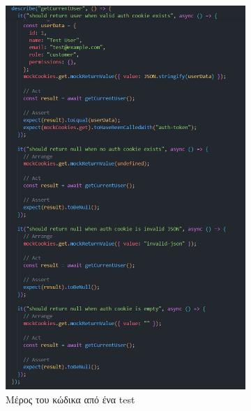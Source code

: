 \documentclass[12pt,a4paper,twoside]{book}
\begin{document}
\begin{figure}[H]
    \centering
    \begin{subfigure}[b]{0.48\textwidth}
        \centering
        \includegraphics[width=\textwidth]{Resources/utils_test_code.png}
        \caption{Μέρος του κώδικα από ένα test}\label{fig:test-code} %
    \end{subfigure}
    \hfill
    \begin{subfigure}[b]{0.48\textwidth}
        \centering

\end{subfigure}
\end{figure}
\end{document}

